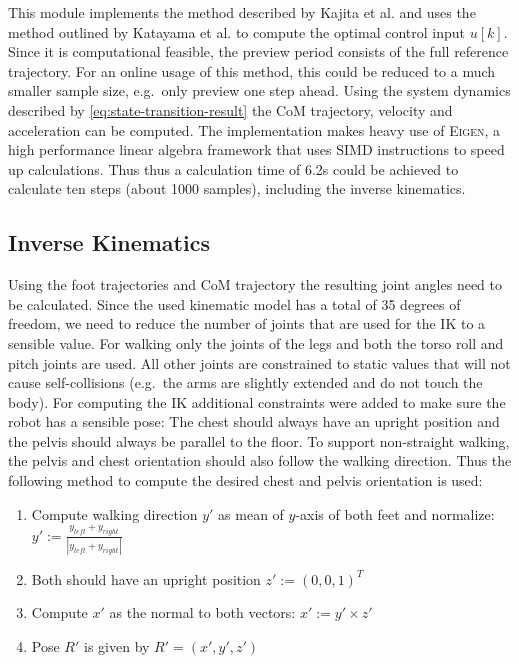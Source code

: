 \documentclass[english,ngerman]{KITreprt}
\newcommand{\name}[1]{\textsc{#1}}
\begin{document}
This module implements the method described by Kajita et al.
\cite{kajita2003biped} and uses the method outlined by Katayama et al.
\cite{katayama1985design} to compute the optimal control input $u[k]$.
Since it is computational feasible, the preview period consists of the
full reference trajectory. For an online usage of this method, this
could be reduced to a much smaller sample size, e.g.~only preview one
step ahead. Using the system dynamics described by
\ref{eq:state-transition-result} the CoM trajectory, velocity and
acceleration can be computed. The implementation makes heavy use of
\name{Eigen}, a high performance linear algebra framework that uses SIMD
instructions to speed up calculations. Thus thus a calculation time of
6.2s could be achieved to calculate ten steps (about 1000 samples),
including the inverse kinematics.

\subsection{Inverse Kinematics}\label{inverse-kinematics}

Using the foot trajectories and CoM trajectory the resulting joint
angles need to be calculated. Since the used kinematic model has a total
of 35 degrees of freedom, we need to reduce the number of joints that
are used for the IK to a sensible value. For walking only the joints of
the legs and both the torso roll and pitch joints are used. All other
joints are constrained to static values that will not cause
self-collisions (e.g.~the arms are slightly extended and do not touch
the body). For computing the IK additional constraints were added to
make sure the robot has a sensible pose: The chest should always have an
upright position and the pelvis should always be parallel to the floor.
To support non-straight walking, the pelvis and chest orientation should
also follow the walking direction. Thus the following method to compute
the desired chest and pelvis orientation is used:

\begin{enumerate}
\def\labelenumi{\arabic{enumi}.}
\item
  Compute walking direction $y'$ as mean of $y$-axis of both feet and
  normalize: $y' := \frac{y_{left} + y_{right}}{|y_{left} + y_{right}|}$
\item
  Both should have an upright position $z' := (0, 0, 1)^T$
\item
  Compute $x'$ as the normal to both vectors: $x' := y' \times z'$
\item
  Pose $R'$ is given by $R' = (x', y', z')$
\end{enumerate}
\end{document}
